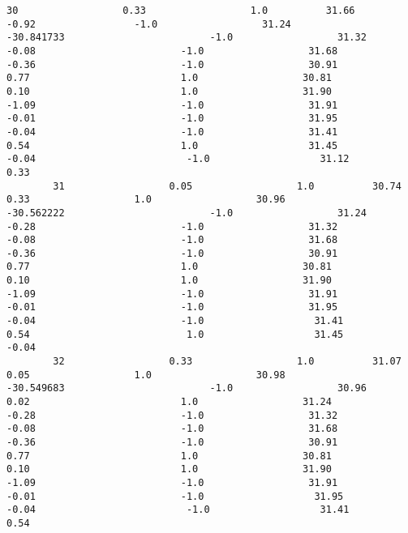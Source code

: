 \documentclass[11pt]{article}
\begin{document}
\begin{Verbatim}[commandchars=\\\{\}]
        30                  0.33                  1.0          31.66                 -0.92                 -1.0                  31.24                  -30.841733                         -1.0                  31.32                         -0.08                         -1.0                  31.68                         -0.36                         -1.0                  30.91                          0.77                          1.0                  30.81                          0.10                          1.0                  31.90                         -1.09                         -1.0                  31.91                         -0.01                         -1.0                  31.95                         -0.04                         -1.0                  31.41                          0.54                          1.0                   31.45                         -0.04                          -1.0                   31.12                           0.33   
        31                  0.05                  1.0          30.74                  0.33                  1.0                  30.96                  -30.562222                         -1.0                  31.24                         -0.28                         -1.0                  31.32                         -0.08                         -1.0                  31.68                         -0.36                         -1.0                  30.91                          0.77                          1.0                  30.81                          0.10                          1.0                  31.90                         -1.09                         -1.0                  31.91                         -0.01                         -1.0                  31.95                         -0.04                         -1.0                   31.41                          0.54                           1.0                   31.45                          -0.04   
        32                  0.33                  1.0          31.07                  0.05                  1.0                  30.98                  -30.549683                         -1.0                  30.96                          0.02                          1.0                  31.24                         -0.28                         -1.0                  31.32                         -0.08                         -1.0                  31.68                         -0.36                         -1.0                  30.91                          0.77                          1.0                  30.81                          0.10                          1.0                  31.90                         -1.09                         -1.0                  31.91                         -0.01                         -1.0                   31.95                         -0.04                          -1.0                   31.41                           0.54   

\end{Verbatim}
\end{document}
